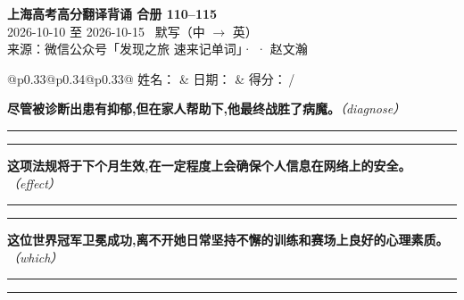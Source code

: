 \documentclass[11pt,a4paper]{article}
\newcommand{\num}[1]{\makebox[1.9em][r]{#1.}\hspace{0.3em}}
\newcommand{\wline}{\noindent\rule{\linewidth}{0.4pt}}
\newcommand{\prompt}[1]{\emph{\textcolor{tipblue}{\small（#1）}}}
\begin{document}
\pagestyle{plain}
\begin{center}
{\LARGE\bfseries 上海高考高分翻译背诵 \quad 合册 110–115}\\[0.25em]
{\large 2026-10-10 至 2026-10-15 \quad\ 默写（中 $\to$ 英）}\\[0.35em]
{\footnotesize 来源：微信公众号「发现之旅 速来记单词」·  · 赵文瀚}
\end{center}

\vspace{0.4em}
\noindent\begin{tabular}{@{}p{0.33\textwidth}@{}p{0.34\textwidth}@{}p{0.33\textwidth}@{}}
姓名：\underline{\hspace{2.0cm}} & 日期：\underline{\hspace{2.0cm}} & 得分：\underline{\hspace{1.4cm}}\,/ \\
\end{tabular}

\vspace{0.5em}

\vspace{0.8em}
\vspace{0.35em}\vspace{0.15em}

\begin{minipage}{\linewidth}

\num{1}\textbf{尽管被诊断出患有抑郁,但在家人帮助下,他最终战胜了病魔。}\prompt{diagnose}

\vspace{0.3em}

\wline\vspace{0.3em}
\wline

\end{minipage}

\begin{minipage}{\linewidth}

\num{2}\textbf{这项法规将于下个月生效,在一定程度上会确保个人信息在网络上的安全。}\prompt{effect}

\vspace{0.3em}

\wline\vspace{0.3em}
\wline

\end{minipage}

\begin{minipage}{\linewidth}

\num{3}\textbf{这位世界冠军卫冕成功,离不开她日常坚持不懈的训练和赛场上良好的心理素质。}\prompt{which}

\vspace{0.3em}

\wline\vspace{0.3em}
\wline

\end{minipage}
\end{document}
